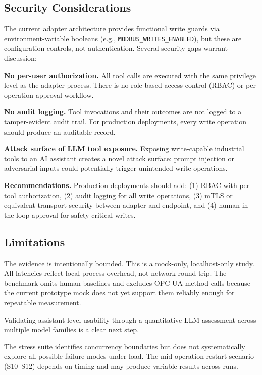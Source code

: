 \documentclass[conference]{IEEEtran}
\begin{document}
\subsection{Security Considerations}
\label{sec:results:security}

The current adapter architecture provides functional write guards via environment-variable booleans (e.g., \texttt{MODBUS\_WRITES\_ENABLED}), but these are configuration controls, not authentication. Several security gaps warrant discussion:

\textbf{No per-user authorization.} All tool calls are executed with the same privilege level as the adapter process. There is no role-based access control (RBAC) or per-operation approval workflow.

\textbf{No audit logging.} Tool invocations and their outcomes are not logged to a tamper-evident audit trail. For production deployments, every write operation should produce an auditable record.

\textbf{Attack surface of LLM tool exposure.} Exposing write-capable industrial tools to an AI assistant creates a novel attack surface: prompt injection or adversarial inputs could potentially trigger unintended write operations.

\textbf{Recommendations.} Production deployments should add: (1) RBAC with per-tool authorization, (2) audit logging for all write operations, (3) mTLS or equivalent transport security between adapter and endpoint, and (4) human-in-the-loop approval for safety-critical writes.

\subsection{Limitations}
\label{sec:results:limitations}

The evidence is intentionally bounded. This is a mock-only, localhost-only study. All latencies reflect local process overhead, not network round-trip. The benchmark omits human baselines and excludes OPC UA method calls because the current prototype mock does not yet support them reliably enough for repeatable measurement.

Validating assistant-level usability through a quantitative LLM assessment across multiple model families is a clear next step.

The stress suite identifies concurrency boundaries but does not systematically explore all possible failure modes under load. The mid-operation restart scenario (S10--S12) depends on timing and may produce variable results across runs.
\end{document}
